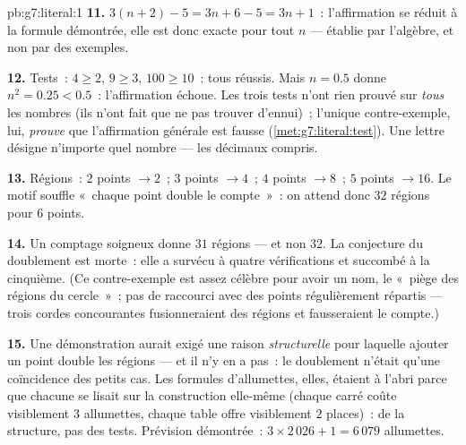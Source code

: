\begin{solution}{pb:g7:literal:1}
\textbf{11.} $3(n + 2) - 5 = 3n + 6 - 5 = 3n + 1$~: l'affirmation se
réduit à la formule démontrée, elle est donc exacte pour tout $n$ ---
établie par l'algèbre, et non par des exemples.

\textbf{12.} Tests~: $4 \geq 2$, $9 \geq 3$, $100 \geq 10$~: tous
réussis. Mais $n = 0.5$ donne $n^2 = 0.25 < 0.5$~: l'affirmation
échoue. Les trois tests n'ont rien prouvé sur \emph{tous} les
nombres (ils n'ont fait que ne pas trouver d'ennui)~; l'unique
contre-exemple, lui, \emph{prouve} que l'affirmation générale est
fausse (\cref{met:g7:literal:test}). Une lettre désigne n'importe
quel nombre --- les décimaux compris.

\textbf{13.} Régions~: $2$ points $\to 2$~; $3$ points $\to 4$~;
$4$ points $\to 8$~; $5$ points $\to 16$. Le motif souffle «~chaque
point double le compte~»~: on attend donc $32$ régions pour $6$
points.

\textbf{14.} Un comptage soigneux donne $31$ régions --- et non
$32$. La conjecture du doublement est morte~: elle a survécu à
quatre vérifications et succombé à la cinquième. (Ce contre-exemple
est assez célèbre pour avoir un nom, le «~piège des régions du
cercle~»~; pas de raccourci avec des points régulièrement répartis
--- trois cordes concourantes fusionneraient des régions et
fausseraient le compte.)

\textbf{15.} Une démonstration aurait exigé une raison
\emph{structurelle} pour laquelle ajouter un point double les
régions --- et il n'y en a pas~: le doublement n'était qu'une
coïncidence des petits cas. Les formules d'allumettes, elles,
étaient à l'abri parce que chacune se lisait sur la construction
elle-même (chaque carré coûte visiblement $3$ allumettes, chaque
table offre visiblement $2$ places)~: de la structure, pas des
tests. Prévision démontrée~: $3 \times 2\,026 + 1 = 6\,079$
allumettes.
\end{solution}
